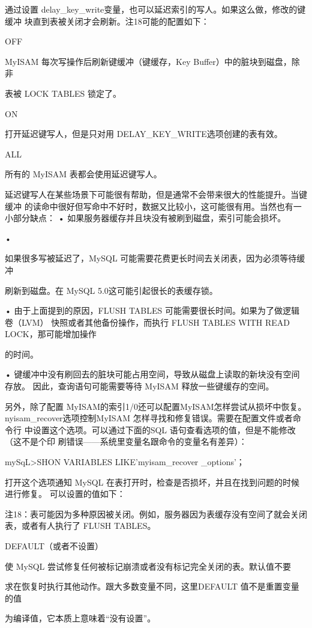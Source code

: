 通过设置 delay\_key\_write变量，也可以延迟索引的写人。如果这么做，修改的键缓冲
块直到表被关闭才会刷新。注18可能的配置如下：

OFF

MyISAM 每次写操作后刷新键缓冲（键缓存，Key Buffer）中的脏块到磁盘，除非

表被 LOCK TABLES 锁定了。

ON

打开延迟键写人，但是只对用 DELAY\_KEY\_WRITE选项创建的表有效。

ALL

所有的 MyISAM 表都会使用延迟键写人。

延迟键写人在某些场景下可能很有帮助，但是通常不会带来很大的性能提升。当键缓冲
的读命中很好但写命中不好时，数据又比较小，这可能很有用。当然也有一小部分缺点：
• 如果服务器缓存并且块没有被刷到磁盘，索引可能会损坏。

•

如果很多写被延迟了，MySQL 可能需要花费更长时间去关闭表，因为必须等待缓冲

刷新到磁盘。在 MySQL 5.0这可能引起很长的表缓存锁。

• 由于上面提到的原因，FLUSH TABLES 可能需要很长时间。如果为了做逻辑卷（LVM）
快照或者其他备份操作，而执行 FLUSH TABLES WITH READ LOCK，那可能增加操作

的时间。

• 键缓冲中没有刷回去的脏块可能占用空间，导致从磁盘上读取的新块没有空间存放。
因此，查询语句可能需要等待 MyISAM 释放一些键缓存的空间。

另外，除了配置 MyISAM的索引1/0还可以配置MyISAM怎样尝试从损坏中恢复。
nyisam\_recover选项控制MyISAM 怎样寻找和修复错误。需要在配置文件或者命令行
中设置这个选项。可以通过下面的SQL 语句查看选项的值，但是不能修改（这不是个印
刷错误——系统里变量名跟命令的变量名有差异）：

mySqL>SHON VARIABLES LIKE'myisam\_recover \_options'；

打开这个选项通知 MySQL 在表打开时，检查是否损坏，并且在找到问题的时候进行修复。
可以设置的值如下：

注18：表可能因为多种原因被关闭。例如，服务器因为表缓存没有空间了就会关闭表，或者有人执行了
FLUSH TABLES。

DEFAULT（或者不设置）

使 MySQL 尝试修复任何被标记崩溃或者没有标记完全关闭的表。默认值不要

求在恢复时执行其他动作。跟大多数变量不同，这里DEFAULT 值不是重置变量的值

为编译值，它本质上意味着“没有设置”。

